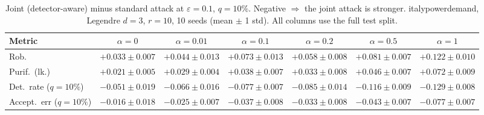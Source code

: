 \begin{table}[htbp]
  \centering
  \small
  \begin{tabular}{@{}lcccccc@{}}
    \toprule
    Metric & $\alpha{=}0$ & $\alpha{=}0.01$ & $\alpha{=}0.1$ & $\alpha{=}0.2$ & $\alpha{=}0.5$ & $\alpha{=}1$ \\
    \midrule
    Rob. & $+0.033 \pm 0.007$ & $+0.044 \pm 0.013$ & $+0.073 \pm 0.013$ & $+0.058 \pm 0.008$ & $+0.081 \pm 0.007$ & $+0.122 \pm 0.010$ \\
    Purif.\ (lk.) & $+0.021 \pm 0.005$ & $+0.029 \pm 0.004$ & $+0.038 \pm 0.007$ & $+0.033 \pm 0.008$ & $+0.046 \pm 0.007$ & $+0.072 \pm 0.009$ \\
    Det.\ rate ($q{=}10\%$) & $-0.051 \pm 0.019$ & $-0.066 \pm 0.016$ & $-0.077 \pm 0.007$ & $-0.085 \pm 0.014$ & $-0.116 \pm 0.009$ & $-0.129 \pm 0.008$ \\
    Accept.\ err ($q{=}10\%$) & $-0.016 \pm 0.018$ & $-0.025 \pm 0.007$ & $-0.037 \pm 0.008$ & $-0.033 \pm 0.008$ & $-0.043 \pm 0.007$ & $-0.077 \pm 0.007$ \\
    \bottomrule
  \end{tabular}
  \caption{Joint (detector-aware) minus standard attack at $\varepsilon=0.1$, $q{=}10\%$. Negative $\Rightarrow$ the joint attack is stronger. italypowerdemand, Legendre $d{=}3$, $r{=}10$, 10 seeds (mean $\pm$ 1 std). All columns use the full test split.}
  \label{tab:italypowerdemand_joint_r10_eps0.1}
\end{table}
